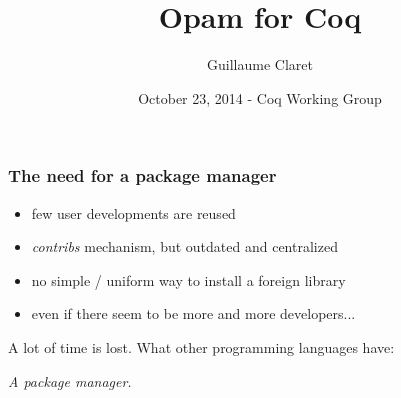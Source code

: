 \documentclass{beamer}
\begin{document}
  \title{Opam for Coq}
  \author{Guillaume Claret}
  \date{October 23, 2014 - Coq Working Group}
  \maketitle

  \begin{frame}
    \frametitle{The need for a package manager}
    \begin{itemize}
      \item few user developments are reused
      \item \emph{contribs} mechanism, but outdated and centralized
      \item no simple / uniform way to install a foreign library
      \item even if there seem to be more and more developers...
    \end{itemize}
    A lot of time is lost. What other programming languages have:
    \begin{center}
      \emph{A package manager.}
    \end{center}
  \end{frame}

  \begin{frame}
    \tableofcontents
  \end{frame}
\end{document}

